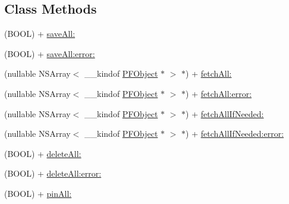 \subsection*{Class Methods}
\begin{DoxyCompactItemize}
\item 
(B\+O\+O\+L) + \hyperlink{category_p_f_object_07_synchronous_08_a45a04d0a783889f890434154bf5f149d}{save\+All\+:}
\begin{DoxyCompactList}\small\item\em 

 \end{DoxyCompactList}\item 
(B\+O\+O\+L) + \hyperlink{category_p_f_object_07_synchronous_08_a64b68e7023d616fc5cc0cdc37e25d66b}{save\+All\+:error\+:}
\item 
(nullable N\+S\+Array$<$ \+\_\+\+\_\+kindof \hyperlink{interface_p_f_object}{P\+F\+Object} $\ast$ $>$ $\ast$) + \hyperlink{category_p_f_object_07_synchronous_08_a83e6e6f31ca6224af347031b33a12a75}{fetch\+All\+:}
\begin{DoxyCompactList}\small\item\em 

 \end{DoxyCompactList}\item 
(nullable N\+S\+Array$<$ \+\_\+\+\_\+kindof \hyperlink{interface_p_f_object}{P\+F\+Object} $\ast$ $>$ $\ast$) + \hyperlink{category_p_f_object_07_synchronous_08_a7daada97128520bf652b1da73c031df0}{fetch\+All\+:error\+:}
\item 
(nullable N\+S\+Array$<$ \+\_\+\+\_\+kindof \hyperlink{interface_p_f_object}{P\+F\+Object} $\ast$ $>$ $\ast$) + \hyperlink{category_p_f_object_07_synchronous_08_a81f20598cd4749c05acce059bcc5af08}{fetch\+All\+If\+Needed\+:}
\item 
(nullable N\+S\+Array$<$ \+\_\+\+\_\+kindof \hyperlink{interface_p_f_object}{P\+F\+Object} $\ast$ $>$ $\ast$) + \hyperlink{category_p_f_object_07_synchronous_08_a4f0fdf00836ff3fa9b7d6926fbcb979c}{fetch\+All\+If\+Needed\+:error\+:}
\item 
(B\+O\+O\+L) + \hyperlink{category_p_f_object_07_synchronous_08_aac06376435a76790f2fe993f58c0718b}{delete\+All\+:}
\begin{DoxyCompactList}\small\item\em 

 \end{DoxyCompactList}\item 
(B\+O\+O\+L) + \hyperlink{category_p_f_object_07_synchronous_08_aa0085ed621b498db0df72e0299f0793b}{delete\+All\+:error\+:}
\item 
(B\+O\+O\+L) + \hyperlink{category_p_f_object_07_synchronous_08_adf5ab1c60be9510588749f46d6639f63}{pin\+All\+:}
\begin{DoxyCompactList}\small\item\em 


\end{DoxyCompactList}
\end{DoxyCompactItemize}
